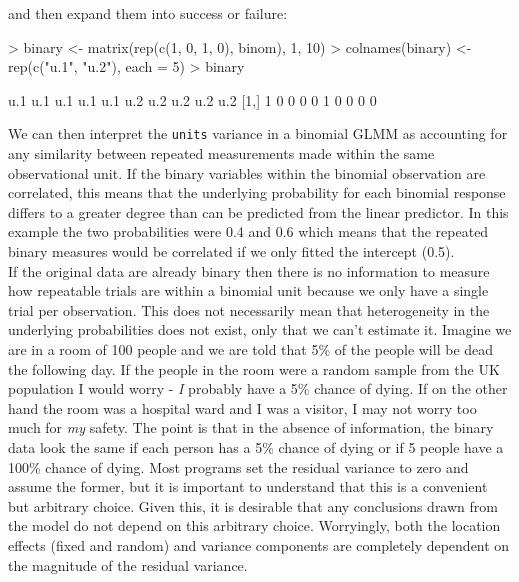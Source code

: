 \documentclass{article}
\begin{document}
and then expand them into success or failure:

\begin{Schunk}
\begin{Sinput}
> binary <- matrix(rep(c(1, 0, 1, 0), binom), 1, 10)
> colnames(binary) <- rep(c("u.1", "u.2"), each = 5)
> binary
\end{Sinput}
\begin{Soutput}
     u.1 u.1 u.1 u.1 u.1 u.2 u.2 u.2 u.2 u.2
[1,]   1   0   0   0   0   1   0   0   0   0
\end{Soutput}
\end{Schunk}

We can then interpret the \texttt{units} variance in a binomial GLMM as accounting for any similarity between repeated measurements made within the same observational unit. If the binary variables within the binomial observation are correlated, this means that the underlying probability for each binomial response differs to a greater degree than can be predicted from the linear predictor. In this example the two probabilities were 0.4 and 0.6 which means that the repeated binary measures would be correlated if we only fitted the intercept (0.5).\\  

If the original data are already binary then there is no information to measure how repeatable trials are within a binomial unit because we only have a single trial per observation. This does not necessarily mean that heterogeneity in the underlying probabilities does not exist, only that we can't estimate it. Imagine we are in a room of 100 people and we are told that 5\% of the people will be dead the following day.  If the people in the room were a random sample from the UK population I would worry - \emph{I} probably have a 5\% chance of dying. If on the other hand the room was a hospital ward and I was a visitor, I may not worry too much for \emph{my} safety. The point is that in the absence of information, the binary data look the same if each person has a 5\% chance of dying or if 5 people have a 100\% chance of dying.  Most programs set the residual variance to zero and assume the former, but it is important to understand that this is a convenient but arbitrary choice. Given this, it is desirable that any conclusions drawn from the model do not depend on this arbitrary choice. Worryingly, both the location effects (fixed and random) and variance components are completely dependent on the magnitude of the residual variance.\\
\end{document}
